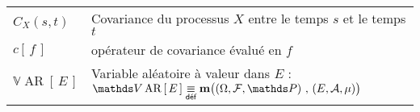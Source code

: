 \begin{table}[H]
\begin{tabularx}{\textwidth}{lX}
	\midrule
	$C_X (s,t)$                                                      & Covariance du processus $X$ entre le temps $s$ et le temps $t$                                                                                                                                             \\
	$c\left[ \, f \, \right]$                                        & opérateur de covariance évalué en $f$                                                                                                                                                                      \\
	$\mathds V \operatorname{AR}\left[ \, E \,\right]$               & Variable aléatoire à valeur dans $E$ : $\mathds V \operatorname{AR}\left[ \, E \,\right] \isdef \mathbf m\bigl( \left(\Omega, \mathcal F, \mathds P\right) \, , \, \left(E, \mathcal A, \mu\right) \bigr)$ \\
	\bottomrule
\end{tabularx}
\end{table}


